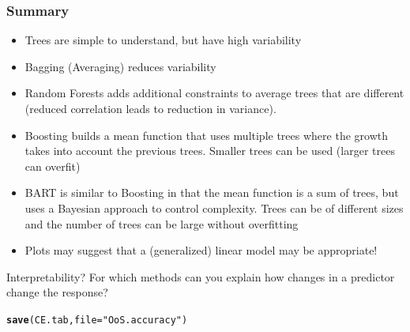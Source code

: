\documentclass[]{beamer}\usepackage[]{graphicx}\usepackage[]{color}
\makeatletter
\newcommand{\hlstr}[1]{\textcolor[rgb]{0.192,0.494,0.8}{#1}}%
\newcommand{\hlstd}[1]{\textcolor[rgb]{0.345,0.345,0.345}{#1}}%
\newcommand{\hlkwc}[1]{\textcolor[rgb]{0.333,0.667,0.333}{#1}}%
\newcommand{\hlkwd}[1]{\textcolor[rgb]{0.737,0.353,0.396}{\textbf{#1}}}%
\newenvironment{kframe}{%
 \def\at@end@of@kframe{}%
 \ifinner\ifhmode%
  \def\at@end@of@kframe{\end{minipage}}%
  \begin{minipage}{\columnwidth}%
 \fi\fi%
 \def\FrameCommand##1{\hskip\@totalleftmargin \hskip-\fboxsep
 \colorbox{shadecolor}{##1}\hskip-\fboxsep
     \hskip-\linewidth \hskip-\@totalleftmargin \hskip\columnwidth}%
 \MakeFramed {\advance\hsize-\width
   \@totalleftmargin\z@ \linewidth\hsize
   \@setminipage}}%
 {\par\unskip\endMakeFramed%
 \at@end@of@kframe}
\newenvironment{knitrout}{}{} %
\makeatother
\begin{document}
\begin{frame}\frametitle{Summary}
  \begin{itemize}
  \item Trees are simple to understand, but have high variability \pause
  \item Bagging (Averaging) reduces variability \pause
  \item Random Forests adds additional constraints to average trees
    that are different (reduced correlation leads to reduction in variance). \pause
  \item Boosting builds a mean function that uses multiple trees where
    the growth takes into account the previous trees.  Smaller trees
    can be used  (larger trees can overfit) \pause
\item BART is similar to Boosting in that the mean function is a sum
  of trees, but uses a Bayesian approach to control complexity.  Trees
  can be of different sizes and the number of trees can be large without overfitting \pause

\item Plots may suggest that a (generalized) linear model  may be appropriate! \pause

  \end{itemize}
Interpretability? For which methods can you explain how changes in a predictor change the response?
\end{frame}
\begin{knitrout}
\color{fgcolor}\begin{kframe}
\begin{alltt}
\hlkwd{save}\hlstd{(CE.tab,} \hlkwc{file}\hlstd{=}\hlstr{"OoS.accuracy"}\hlstd{)}
\end{alltt}
\end{kframe}
\end{knitrout}
\end{document}
